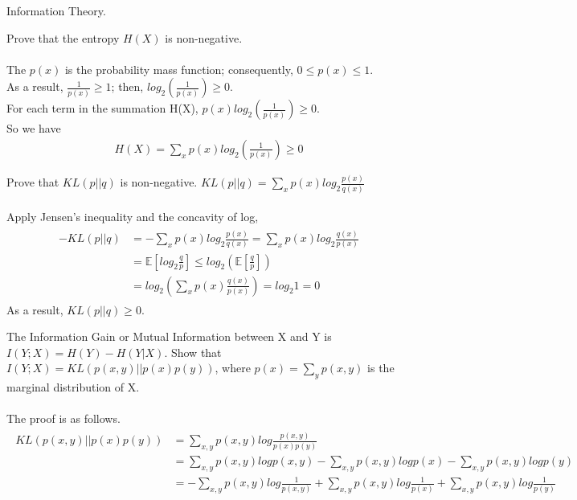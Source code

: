 \documentclass{myhw}
\begin{document}
\begin{homeworkProblem}
Information Theory.
\begin{homeworkSection}
Prove that the entropy $H(X)$ is non-negative. \\
\\
The $p(x)$ is the probability mass function; consequently, $0 \le p(x) \le 1$. \\
As a result, $\frac{1}{p(x)} \ge 1$; then, $log_2(\frac{1}{p(x)}) \ge 0$. \\
For each term in the summation H(X), $p(x)log_2(\frac{1}{p(x)}) \ge 0$. \\
So we have 
\begin{gather*}
H(X) = \sum_x{p(x)log_2(\frac{1}{p(x)})} \ge 0
\end{gather*}
\end{homeworkSection}
\begin{homeworkSection}
Prove that $KL(p||q)$ is non-negative. $KL(p||q) = \sum_x{p(x)log_2\frac{p(x)}{q(x)}}$\\
\\
Apply Jensen’s inequality and the concavity of log, 
\begin{gather*}
\begin{aligned}
-KL(p||q) &= - \sum_x{p(x)log_2\frac{p(x)}{q(x)}} = \sum_x{p(x)log_2\frac{q(x)}{p(x)}} \\
&= \mathbb{E}[log_2\frac{q}{p}] \le log_2(\mathbb{E}[\frac{q}{p}]) \\
&= log_2(\sum_x{p(x)\frac{q(x)}{p(x)}}) = log_2 1 = 0
\end{aligned}
\end{gather*}
As a result, $KL(p||q) \ge 0$.
\end{homeworkSection}
\begin{homeworkSection}
The Information Gain or Mutual Information between X and Y is $I(Y;X) = H(Y) - H(Y|X)$. 
Show that $I(Y;X) = KL(p(x, y)||p(x)p(y))$,  where $p(x)=\sum_{y}{p(x, y)}$ is the marginal distribution of X. \\
\\
The proof is as follows.
\begin{gather*}
\begin{aligned}
KL(p(x, y)||p(x)p(y)) &= \sum_{x, y}{p(x, y)log\frac{p(x, y)}{p(x)p(y)}} \\
& = \sum_{x, y}{p(x, y)log p(x, y)} - \sum_{x, y}{p(x, y)log p(x)} - \sum_{x, y}{p(x, y)log p(y)} \\
& = - \sum_{x, y}{p(x, y)log\frac{1}{p(x, y)}} + \sum_{x, y}{p(x, y)log\frac{1}{p(x)}} + \sum_{x, y}{p(x, y)log\frac{1}{p(y)}} \\

\end{aligned}
\end{gather*}
\end{homeworkSection}
\end{homeworkProblem}
\end{document}
